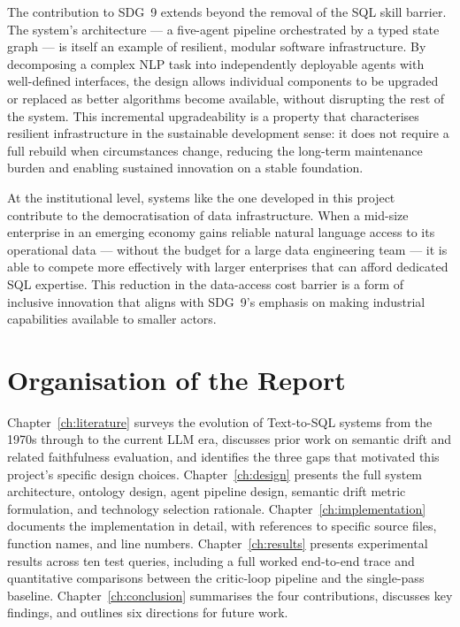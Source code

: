 \documentclass[12pt,a4paper]{report}
\begin{document}
The contribution to \ac{SDG}~9 extends beyond the removal of the SQL skill barrier. The system's architecture — a five-agent pipeline orchestrated by a typed state graph — is itself an example of resilient, modular software infrastructure. By decomposing a complex NLP task into independently deployable agents with well-defined interfaces, the design allows individual components to be upgraded or replaced as better algorithms become available, without disrupting the rest of the system. This incremental upgradeability is a property that characterises resilient infrastructure in the sustainable development sense: it does not require a full rebuild when circumstances change, reducing the long-term maintenance burden and enabling sustained innovation on a stable foundation.

At the institutional level, systems like the one developed in this project contribute to the democratisation of data infrastructure. When a mid-size enterprise in an emerging economy gains reliable natural language access to its operational data — without the budget for a large data engineering team — it is able to compete more effectively with larger enterprises that can afford dedicated SQL expertise. This reduction in the data-access cost barrier is a form of inclusive innovation that aligns with \ac{SDG}~9's emphasis on making industrial capabilities available to smaller actors.

\section{Organisation of the Report}
\label{sec:organisation}

Chapter~\ref{ch:literature} surveys the evolution of Text-to-SQL systems from the 1970s through to the current \ac{LLM} era, discusses prior work on semantic drift and related faithfulness evaluation, and identifies the three gaps that motivated this project's specific design choices. Chapter~\ref{ch:design} presents the full system architecture, ontology design, agent pipeline design, semantic drift metric formulation, and technology selection rationale. Chapter~\ref{ch:implementation} documents the implementation in detail, with references to specific source files, function names, and line numbers. Chapter~\ref{ch:results} presents experimental results across ten test queries, including a full worked end-to-end trace and quantitative comparisons between the critic-loop pipeline and the single-pass baseline. Chapter~\ref{ch:conclusion} summarises the four contributions, discusses key findings, and outlines six directions for future work.
\end{document}
